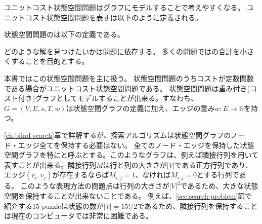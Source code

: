 ユニットコスト状態空間問題はグラフにモデルすることで考えやすくなる。
ユニットコスト状態空間問題を表すは以下のように定義される。


状態空間問題のは以下の定義である。


どのような解を見つけたいかは問題に依存する。
多くの問題ではの合計を小さくすることを目的とする。



本書ではこの状態空間問題を主に扱う。
状態空間問題のうちコストが定数関数である場合がユニットコスト状態空間問題である。
状態空間問題は重み付き(コスト付き)グラフとしてモデルすることが出来る。すなわち、$G = (V, E, s, T, w)$は状態空間グラフの定義に加え、エッジの重み$w: E \rightarrow \mathbb{R}$を持つ。

\ref{ch:blind-search}章で詳解するが、探索アルゴリズムは状態空間グラフのノード・エッジ全てを保持する必要はない。
全てのノード・エッジを保持した状態空間グラフを特にと呼ぶとする。このようなグラフは、例えば隣接行列を用いて表すことが出来る。隣接行列$M$は行と列の大きさが$|V|$である正方行列であり、エッジ$(v_i, v_j)$が存在するならば$M_{i,j}=1$、なければ$M_{i,j}=0$とする行列である。
このような表現方法の問題点は行列の大きさが$|V|^2$であるため、大きな状態空間を保持することが出来ないことである。
例えば、\ref{sec:search-problem}節で紹介する15-puzzleは状態の数が$|V|=15!/2$であるため、隣接行列を保持することは現在のコンピュータでは非常に困難である。

